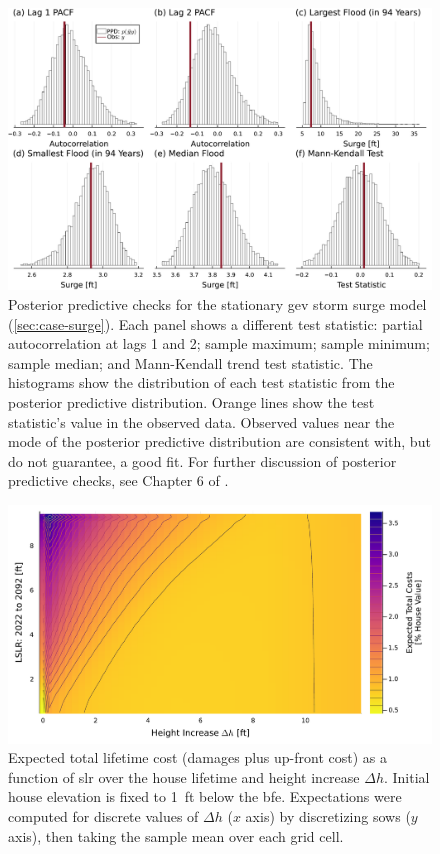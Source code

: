 \documentclass[11pt]{article}
\begin{document}
\begin{figure}
    \centering
    \includegraphics[width=\textwidth]{surge-test-statistics}
    \caption{
        Posterior predictive checks for the stationary \gls{gev} storm surge model (\cref{sec:case-surge}).
        Each panel shows a different test statistic: partial autocorrelation at lags 1 and 2; sample maximum; sample minimum; sample median; and Mann-Kendall trend test statistic.
        The histograms show the distribution of each test statistic from the posterior predictive distribution.
        Orange lines show the test statistic's value in the observed data.
        Observed values near the mode of the posterior predictive distribution are consistent with, but do not guarantee, a good fit.
        For further discussion of posterior predictive checks, see Chapter 6 of \citet{gelman_bda3:2014}.
    }\label{fig:surge-test-statistics}
\end{figure}

\begin{figure}
    \includegraphics[width=\textwidth]{scenario-map-height-slr}
    \caption{
        Expected total lifetime cost (damages plus up-front cost) as a function of \gls{slr} over the house lifetime and height increase $\Delta h$.
        Initial house elevation is fixed to \SI{1}{ft} below the \gls{bfe}.
        Expectations were computed for discrete values of $\Delta h$ ($x$ axis) by discretizing \glspl{sow} ($y$ axis), then taking the sample mean over each grid cell.
    }\label{fig:scenario-map-height-slr}
\end{figure}
\end{document}
